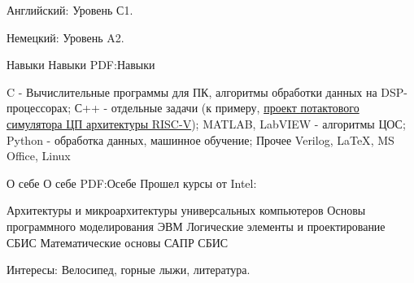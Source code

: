 \documentclass[a4paper, MMyyyy,nonstopmode]{simpleresumecv}
\begin{document}
\begin{Body}
\BulletItem
Английский: Уровень С1.

\Gap
\BulletItem
Немецкий: Уровень A2.


\Section
{Навыки}
{Навыки}
{PDF:Навыки}

\BulletItem
C - Вычислительные программы для ПК, алгоритмы обработки данных на DSP-процессорах;
\Gap
\BulletItem С++ - отдельные задачи (к примеру, \href{https://github.com/PaulZakharov/riscv-in-nutshell}{проект потактового симулятора ЦП архитектуры RISC-V});
\Gap
\BulletItem
MATLAB, LabVIEW - алгоритмы ЦОС;
\Gap
\BulletItem
Python - обработка данных, машинное обучение;
\Gap
\BulletItem
Прочее
\SubBulletItem
Verilog,
\SubBulletItem
{\LaTeX},
\SubBulletItem
MS Office,
\SubBulletItem
Linux


\Section
{О себе}
{О себе}
{PDF:Осебе}
\BulletItem
Прошел курсы от Intel:
\begin{Detail}
\SubBulletItem
Архитектуры и микроархитектуры универсальных компьютеров
\SubBulletItem
Основы программного моделирования ЭВМ
\SubBulletItem
Логические элементы и проектирование СБИС
\SubBulletItem
Математические основы САПР СБИС
\end{Detail}
\Gap
\BulletItem
Интересы:
Велосипед, 
горные лыжи,
литература.






\end{Body}
\end{document}
